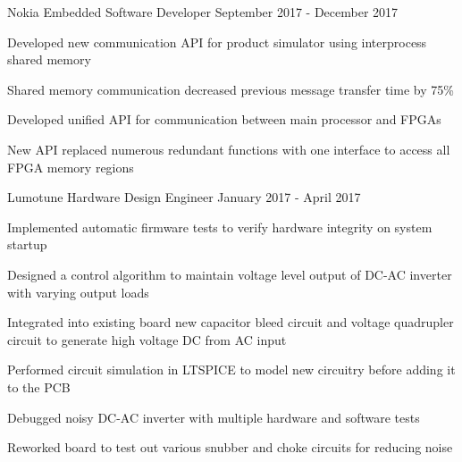 

\begin{cventries}

  \cventry
    {Nokia} %
    {Embedded Software Developer} %
    {September 2017 - December 2017} %
    {}
    {
      \begin{cvitems} %
        \item {Developed new communication API for product simulator using interprocess shared memory}
        \item {Shared memory communication decreased previous message transfer time by 75\%}
        \item {Developed unified API for communication between main processor and FPGAs}
        \item {New API replaced numerous redundant functions with one interface to access all FPGA memory regions}
      \end{cvitems}
    }

  \cventry
    {Lumotune} %
    {Hardware Design Engineer} %
    {January 2017 - April 2017} %
    {}
    {
      \begin{cvitems} %
        \item {Implemented automatic firmware tests to verify hardware integrity on system startup}
        \item {Designed a control algorithm to maintain voltage level output of DC-AC inverter with varying output loads}
        \item {Integrated into existing board new capacitor bleed circuit and voltage quadrupler circuit to generate high voltage DC from AC input}
        \item {Performed circuit simulation in LTSPICE to model new circuitry before adding it to the PCB}
        \item {Debugged noisy DC-AC inverter with multiple hardware and software tests}
        \item {Reworked board to test out various snubber and choke circuits for reducing noise}
      \end{cvitems}
    }


\end{cventries}
